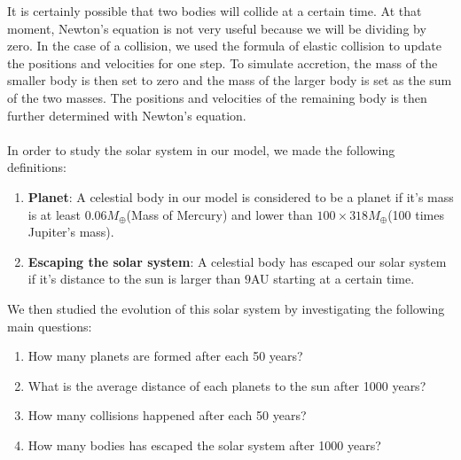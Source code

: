 It is certainly possible that two bodies will collide at a certain time. At that moment, Newton's equation is not very useful because we will be dividing by zero. In the case of a collision, we used the formula of elastic collision to update the positions and velocities for one step. To simulate accretion, the mass of the smaller body is then set to zero and the mass of the larger body is set as the sum of the two masses. The positions and velocities of the remaining body is then further determined with Newton's equation.\\
\\
In order to study the solar system in our model, we made the following definitions:\\
\begin{enumerate}
\item \textbf{Planet}: A celestial body in our model is considered to be a planet if it's mass is at least  0.06$M_{\oplus}$(Mass of Mercury) and lower than $100\times 318M_{\oplus}$(100 times Jupiter's mass).
\item \textbf{Escaping the solar system}: A celestial body has escaped our solar system if it's distance to the sun is larger than $9$AU starting at a certain time.
\end{enumerate}
We then studied the evolution of this solar system by investigating the following main questions:
\begin{enumerate}
	\item 	How many planets are formed after each 50 years? 

	\item What is the average distance of each planets to the sun after 1000 years?
	
	\item How many collisions happened after each 50 years?
	
	\item How many bodies has escaped the solar system after 1000 years?
\end{enumerate}
 